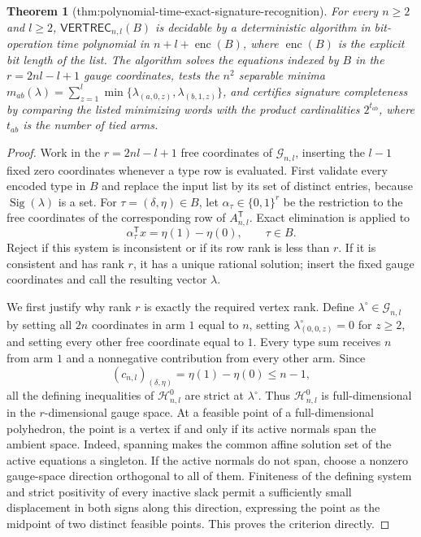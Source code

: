 \documentclass{article}
\newtheorem{theorem}{Theorem}
\begin{document}
\begin{theorem}[thm:polynomial-time-exact-signature-recognition]\label{thm:polynomial-time-exact-signature-recognition}
For every \(n\ge2\) and \(l\ge2\), \(\mathsf{VERTREC}_{n,l}(B)\) is decidable by a deterministic algorithm in bit-operation time polynomial in \(n+l+\operatorname{enc}(B)\), where \(\operatorname{enc}(B)\) is the explicit bit length of the list. The algorithm solves the equations indexed by \(B\) in the \(r=2nl-l+1\) gauge coordinates, tests the \(n^2\) separable minima \(m_{ab}(\lambda)=\sum_{z=1}^l\min\{\lambda_{(a,0,z)},\lambda_{(b,1,z)}\}\), and certifies signature completeness by comparing the listed minimizing words with the product cardinalities \(2^{t_{ab}}\), where \(t_{ab}\) is the number of tied arms.
\end{theorem}
\begin{proof}
Work in the \(r=2nl-l+1\) free coordinates of \(\mathcal G_{n,l}\), inserting the \(l-1\) fixed zero coordinates whenever a type row is evaluated. First validate every encoded type in \(B\) and replace the input list by its set of distinct entries, because \(\operatorname{Sig}(\lambda)\) is a set. For \(\tau=(\delta,\eta)\in B\), let \(\alpha_\tau\in\{0,1\}^r\) be the restriction to the free coordinates of the corresponding row of \(A_{n,l}^{\mathsf T}\). Exact elimination is applied to
\[
\alpha_\tau^{\mathsf T}x=\eta(1)-\eta(0),\qquad \tau\in B.
\]
Reject if this system is inconsistent or if its row rank is less than \(r\). If it is consistent and has rank \(r\), it has a unique rational solution; insert the fixed gauge coordinates and call the resulting vector \(\lambda\).

We first justify why rank \(r\) is exactly the required vertex rank. Define \(\lambda^\circ\in\mathcal G_{n,l}\) by setting all \(2n\) coordinates in arm \(1\) equal to \(n\), setting \(\lambda^\circ_{(0,0,z)}=0\) for \(z\ge2\), and setting every other free coordinate equal to \(1\). Every type sum receives \(n\) from arm \(1\) and a nonnegative contribution from every other arm. Since
\[
(c_{n,l})_{(\delta,\eta)}=\eta(1)-\eta(0)\le n-1,
\]
all the defining inequalities of \(\mathcal H^0_{n,l}\) are strict at \(\lambda^\circ\). Thus \(\mathcal H^0_{n,l}\) is full-dimensional in the \(r\)-dimensional gauge space. At a feasible point of a full-dimensional polyhedron, the point is a vertex if and only if its active normals span the ambient space. Indeed, spanning makes the common affine solution set of the active equations a singleton. If the active normals do not span, choose a nonzero gauge-space direction orthogonal to all of them. Finiteness of the defining system and strict positivity of every inactive slack permit a sufficiently small displacement in both signs along this direction, expressing the point as the midpoint of two distinct feasible points. This proves the criterion directly.


\end{proof}
\end{document}
